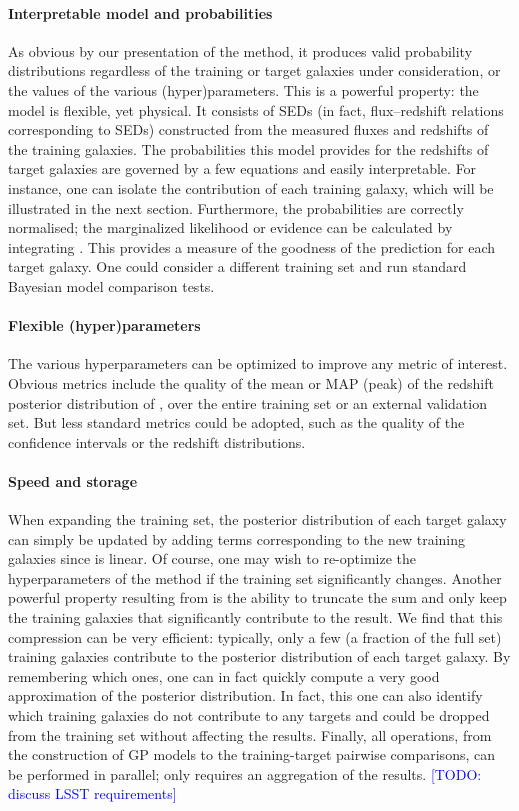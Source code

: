 \documentclass[aps,prd,showpacs,superscriptaddress,groupedaddress]{revtex4}  %
\newcommand{\todo}[1]{\textcolor{blue}{[TODO: #1]}}
\begin{document}
\paragraph{Interpretable model and probabilities} 
As obvious by our presentation of the method, it produces valid probability distributions regardless of the training or target galaxies under consideration, or the values of the various (hyper)parameters.
This is a powerful property: the model is flexible, yet physical.
It consists of SEDs (in fact, flux--redshift relations corresponding to SEDs) constructed from the measured fluxes and redshifts of the training galaxies.
The probabilities this model provides for the redshifts of target galaxies are governed by a few equations and easily interpretable. 
For instance, one can isolate the contribution of each training galaxy, which will be illustrated in the next section.
Furthermore, the probabilities are correctly normalised; the marginalized likelihood or evidence can be calculated by integrating . 
This provides a measure of the goodness of the prediction for each target galaxy.
One could consider a different training set and run standard Bayesian model comparison tests. 

\paragraph{Flexible (hyper)parameters}
The various hyperparameters can be optimized to improve any metric of interest.
Obvious metrics include the quality of the mean or MAP (peak) of the redshift posterior distribution of , over the entire training set or an external validation set.
But less standard metrics could be adopted, such as the quality of the confidence intervals or the redshift distributions.

\paragraph{Speed and storage}
When expanding the training set, the posterior distribution of each target galaxy can simply be updated by adding terms corresponding to the new training galaxies since  is linear.
Of course, one may wish to re-optimize the hyperparameters of the method if the training set significantly changes. 
Another powerful property resulting from  is the ability to truncate the sum and only keep the training galaxies that significantly contribute to the result.
We find that this compression can be very efficient: typically, only a few (\ie a fraction of the full set) training galaxies contribute to the posterior distribution of each target galaxy.
By remembering which ones, one can in fact quickly compute a very good approximation of the posterior distribution. 
In fact, this one can also identify which training galaxies do not contribute to any targets and could be dropped from the training set without affecting the results.
Finally, all operations, from the construction of GP models to the training-target pairwise comparisons, can be performed in parallel; only  requires an aggregation of the results.
\todo{discuss LSST requirements}
 
\end{document}
